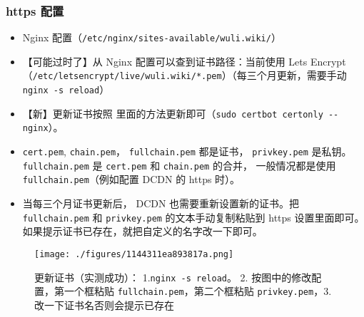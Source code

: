\subsubsection{https 配置}
\begin{itemize}
\item Nginx 配置（\verb`/etc/nginx/sites-available/wuli.wiki/`）
\item 【可能过时了】从 Nginx 配置可以查到证书路径：当前使用 Lets Encrypt （\verb`/etc/letsencrypt/live/wuli.wiki/*.pem`）（每三个月更新，需要手动 \verb`nginx -s reload`）
\item 【新】更新证书按照 里面的方法更新即可（\verb`sudo certbot certonly --nginx`）。
\item \verb`cert.pem`, \verb`chain.pem`， \verb`fullchain.pem` 都是证书， \verb`privkey.pem` 是私钥。 \verb`fullchain.pem` 是 \verb`cert.pem` 和 \verb`chain.pem` 的合并， 一般情况都是使用 \verb`fullchain.pem`（例如配置 DCDN 的 https 时）。
\
\item 当每三个月证书更新后， DCDN 也需要重新设置新的证书。把 \verb`fullchain.pem` 和 \verb`privkey.pem` 的文本手动复制粘贴到 https 设置里面即可。如果提示证书已存在，就把自定义的名字改一下即可。
\end{itemize}
\begin{figure}[ht]
\centering
\texttt{[image: ./figures/1144311ea893817a.png]}
\caption{更新证书（实测成功）： 1.\verb`nginx -s reload`。 2. 按图中的修改配置，第一个框粘贴 \verb`fullchain.pem`，第二个框粘贴 \verb`privkey.pem`，3.改一下证书名否则会提示已存在} \label{fig_myCode_1}
\end{figure}
